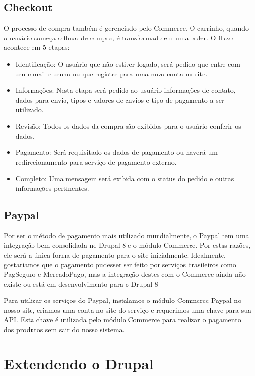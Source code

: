 \subsection{Checkout}
O processo de compra também é gerenciado pelo Commerce. O carrinho, quando o usuário começa o fluxo de compra, é transformado em uma order. O fluxo acontece em 5 etapas:

\begin{itemize}
  \item Identificação: O usuário que não estiver logado, será pedido que entre com seu e-mail e senha ou que registre para uma nova conta no site.
  \item Informações: Nesta etapa será pedido ao usuário informações de contato, dados para envio, tipos e valores de envios e tipo de pagamento a ser utilizado.
  \item Revisão: Todos os dados da compra são exibidos para o usuário conferir os dados.
  \item Pagamento: Será requisitado os dados de pagamento ou haverá um redirecionamento para serviço de pagamento externo.
  \item Completo: Uma mensagem será exibida com o status do pedido e outras informações pertinentes.
\end{itemize}

\subsection{Paypal}
Por ser o método de pagamento mais utilizado mundialmente, o Paypal tem uma integração bem consolidada no Drupal 8 e o módulo Commerce. Por estas razões, ele será a única forma de pagamento para o site inicialmente. Idealmente, gostariamos que o pagamento pudesser ser feito por serviços brasileiros como PagSeguro e MercadoPago, mas a integração destes com o Commerce ainda não existe ou está em desenvolvimento para o Drupal 8.

Para utilizar os serviços do Paypal, instalamos o módulo Commerce Paypal no nosso site, criamos uma conta no site do serviço e requerimos uma chave para sua API. Esta chave é utilizada pelo módulo Commerce para realizar o pagamento dos produtos sem sair do nosso sistema.

\section{Extendendo o Drupal}

